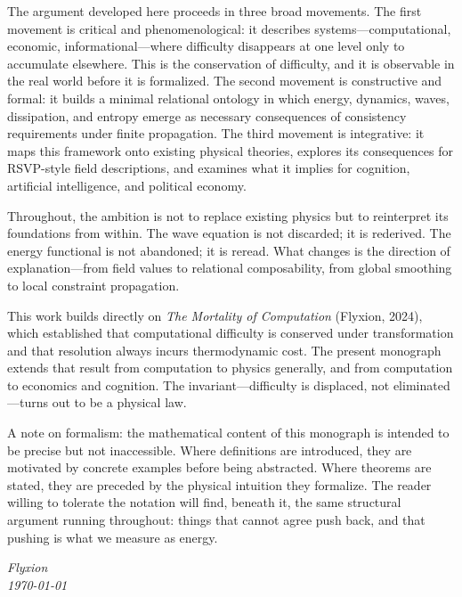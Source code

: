 \documentclass[12pt,a4paper,openany]{book}
\theoremstyle{plain}
\theoremstyle{definition}
\theoremstyle{remark}
\begin{document}
The argument developed here proceeds in three broad movements. The first movement is critical and phenomenological: it describes systems---computational, economic, informational---where difficulty disappears at one level only to accumulate elsewhere. This is the conservation of difficulty, and it is observable in the real world before it is formalized. The second movement is constructive and formal: it builds a minimal relational ontology in which energy, dynamics, waves, dissipation, and entropy emerge as necessary consequences of consistency requirements under finite propagation. The third movement is integrative: it maps this framework onto existing physical theories, explores its consequences for RSVP-style field descriptions, and examines what it implies for cognition, artificial intelligence, and political economy.

Throughout, the ambition is not to replace existing physics but to reinterpret its foundations from within. The wave equation is not discarded; it is rederived. The energy functional is not abandoned; it is reread. What changes is the direction of explanation---from field values to relational composability, from global smoothing to local constraint propagation.

This work builds directly on \textit{The Mortality of Computation} (Flyxion, 2024), which established that computational difficulty is conserved under transformation and that resolution always incurs thermodynamic cost. The present monograph extends that result from computation to physics generally, and from computation to economics and cognition. The invariant---difficulty is displaced, not eliminated---turns out to be a physical law.

A note on formalism: the mathematical content of this monograph is intended to be precise but not inaccessible. Where definitions are introduced, they are motivated by concrete examples before being abstracted. Where theorems are stated, they are preceded by the physical intuition they formalize. The reader willing to tolerate the notation will find, beneath it, the same structural argument running throughout: things that cannot agree push back, and that pushing is what we measure as energy.

\bigskip
\noindent\textit{Flyxion}\\
\textit{\today}

\clearpage

\tableofcontents
\end{document}
